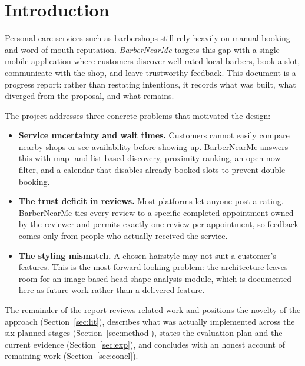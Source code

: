 \documentclass[14pt]{article}
\begin{document}
\cleardoublepage

\section{Introduction}
Personal-care services such as barbershops still rely heavily on manual
booking and word-of-mouth reputation. \emph{BarberNearMe} targets this
gap with a single mobile application where customers discover well-rated
local barbers, book a slot, communicate with the shop, and leave
trustworthy feedback. This document is a progress report: rather than
restating intentions, it records what was built, what diverged from the
proposal, and what remains.

The project addresses three concrete problems that motivated the design:

\begin{itemize}
  \item \textbf{Service uncertainty and wait times.} Customers cannot
        easily compare nearby shops or see availability before showing
        up. BarberNearMe answers this with map- and list-based discovery,
        proximity ranking, an open-now filter, and a calendar that
        disables already-booked slots to prevent double-booking.
  \item \textbf{The trust deficit in reviews.} Most platforms let anyone
        post a rating. BarberNearMe ties every review to a specific
        completed appointment owned by the reviewer and permits exactly
        one review per appointment, so feedback comes only from people
        who actually received the service.
  \item \textbf{The styling mismatch.} A chosen hairstyle may not suit a
        customer's features. This is the most forward-looking problem:
        the architecture leaves room for an image-based head-shape
        analysis module, which is documented here as future work rather
        than a delivered feature.
\end{itemize}

The remainder of the report reviews related work and positions the
novelty of the approach (Section~\ref{sec:lit}), describes what was
actually implemented across the six planned stages
(Section~\ref{sec:method}), states the evaluation plan and the current
evidence (Section~\ref{sec:exp}), and concludes with an honest account
of remaining work (Section~\ref{sec:concl}).

\end{document}
